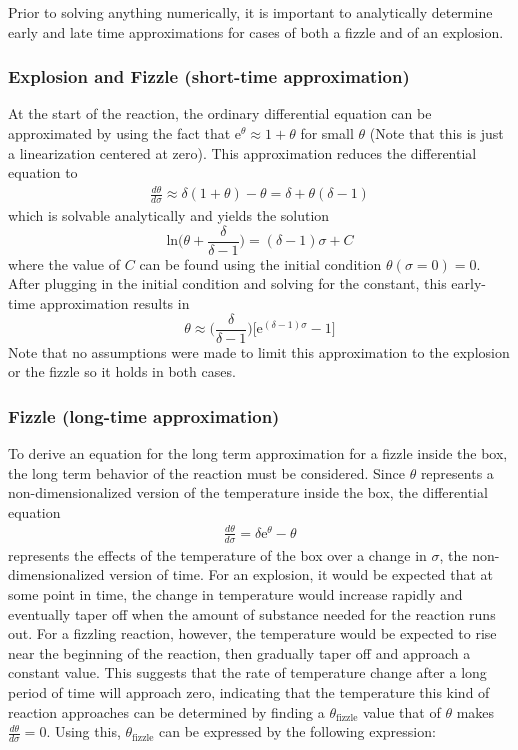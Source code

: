 \documentclass{article}
\begin{document}
\noindent Prior to solving anything numerically, it is important to analytically determine early and late time approximations for cases of both a fizzle and of an explosion.  
\subsubsection*{Explosion and Fizzle (short-time approximation)}
At the start of the reaction, the ordinary differential equation can be approximated by using the fact that $\text{e}^\theta \approx 1+\theta$ for small $\theta$ (Note that this is just a linearization centered at zero).  This approximation reduces the differential equation to
\begin{align*}
    \frac{d\theta}{d\sigma}
                            \approx \delta (1+\theta) - \theta = \delta + \theta(\delta - 1)
\end{align*}
which is solvable analytically and yields the solution
$$\text{ln}\Big(\theta+\frac{\delta}{\delta-1}\Big) = (\delta - 1) \sigma + C$$ where the value of $C$ can be found using the initial condition $\theta(\sigma = 0) = 0$.  After plugging in the initial condition and solving for the constant, this early-time approximation results in
$$\theta \approx \Big(\frac{\delta}{\delta - 1}\Big)\Big[\text{e}^{(\delta-1)\sigma}-1\Big]$$
Note that no assumptions were made to limit this approximation to the explosion or the fizzle so it holds in both cases.

\subsubsection*{Fizzle (long-time approximation)}
To derive an equation for the long term approximation for a fizzle inside the box, the long term behavior of the reaction must be considered. Since $\theta$ represents a non-dimensionalized version of the temperature inside the box, the differential equation 
\begin{align*}
    \frac{d\theta}{d\sigma} = \delta \text{e}^\theta - \theta
\end{align*}
represents the effects of the temperature of the box over a change in $\sigma$, the non-dimensionalized version of time. For an explosion, it would be expected that at some point in time, the change in temperature would increase rapidly and eventually taper off when the amount of substance needed for the reaction runs out. For a fizzling reaction, however, the temperature would be expected to rise near the beginning of the reaction, then gradually taper off and approach a constant value. This suggests that the rate of temperature change after a long period of time will approach zero, indicating that the temperature this kind of reaction approaches can be determined by finding a $\theta_\text{fizzle}$ value that of $\theta$ makes $\frac{d\theta}{d\sigma} = 0$. Using this, $\theta_\text{fizzle}$ can be expressed by the following expression: 
\end{document}
